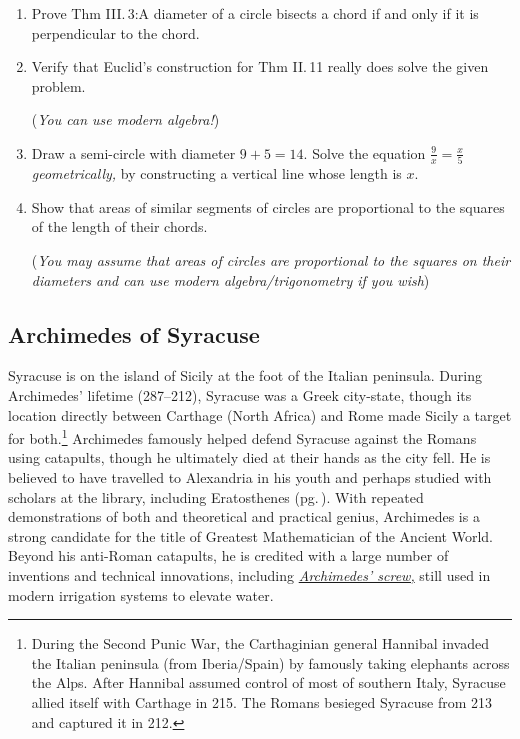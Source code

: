 \begin{exercises}
\begin{enumerate}
	
	  \item%
	  Prove Thm III.\,3:\lstsp A diameter of a circle bisects a chord if and only if it is perpendicular to the chord.
	  
	  
	  \item Verify that Euclid's construction for Thm II.\,11 really does solve the given problem.\par
	  (\emph{You can use modern algebra!})
	  
	    
	  \item%
	  Draw a semi-circle with diameter $9+5=14$. Solve the equation $\frac 9x=\frac x5$ \emph{geometrically,} by constructing a vertical line whose length is $x$.
	  
	  
	  \item%
	  Show that areas of similar segments of circles are proportional to the squares of the length of their chords.\par
	  (\emph{You may assume that areas of circles are proportional to the squares on their diameters and can use modern algebra/trigonometry if you wish})
	\end{enumerate}

\end{exercises}


\clearpage




\subsection{Archimedes of Syracuse}\label{sec:archimedes}

Syracuse is on the island of Sicily at the foot of the Italian peninsula. During Archimedes' lifetime (287--212\BC), Syracuse was a Greek city-state, though its location directly between Carthage (North Africa) and Rome made Sicily a target for both.\footnote{%
	During the Second Punic War, the Carthaginian general Hannibal invaded the Italian peninsula (from Iberia/Spain) by famously taking elephants across the Alps. After Hannibal assumed control of most of southern Italy, Syracuse allied itself with Carthage in 215\BC. The Romans besieged Syracuse from 213 and captured it in 212.
}
Archimedes famously helped defend Syracuse against the Romans using catapults, though he ultimately died at their hands as the city fell. He is believed to have travelled to Alexandria in his youth and perhaps studied with scholars at the library, including Eratosthenes (pg.\,\pageref{pg:eratosthenes}).
\smallbreak
With repeated demonstrations of both and theoretical and practical genius, Archimedes is a strong candidate for the title of Greatest Mathematician of the Ancient World. Beyond his anti-Roman catapults, he is credited with a large number of inventions and technical innovations, including \href{https://en.wikipedia.org/wiki/Archimedes'_screw}{\emph{Archimedes' screw,}} still used in modern irrigation systems to elevate water.


